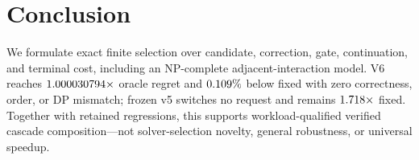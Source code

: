 \section{Conclusion}
\label{sec:conclusion}

We formulate exact finite selection over candidate, correction, gate, continuation,
and terminal cost, including an NP-complete adjacent-interaction model. V6 reaches
$1.000030794\times$ oracle regret and
$0.109\%$ below fixed with zero correctness, order, or
DP mismatch; frozen v5 switches no request and remains
$1.718\times$ fixed. Together with retained regressions, this
supports workload-qualified verified cascade composition---not solver-selection
novelty, general robustness, or universal speedup.
